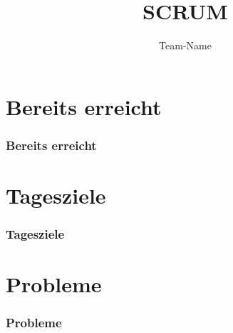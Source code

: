 \documentclass[ddcfooter,nototalpage]{tudbeamer}
\begin{document}
\title{SCRUM}
\author{Team-Name}
\maketitle

\section{Bereits erreicht}
\begin{frame}
\frametitle{Bereits erreicht}
\end{frame}

\section{Tagesziele}
\begin{frame}
\frametitle{Tagesziele}
\end{frame}

\section{Probleme}
\begin{frame}
\frametitle{Probleme}
\end{frame}
\end{document}
